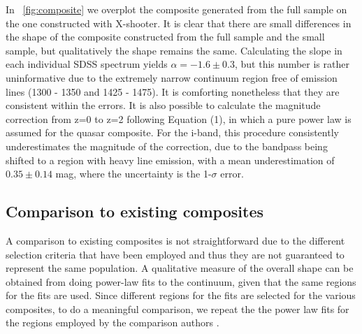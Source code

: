 \documentclass{aa}    %
\newcommand{\figref}[1]{\ref{fig:#1}}
\newcommand{\Fig}[1]{\figurename~\figref{#1}}
\newcommand{\fig}[1]{\Fig{#1}}
\newcommand{\figlabel}[1]{\label{fig:#1}}
\newcommand{\sectlabel}[1]{\label{sect:#1}}
\newcommand{\todo}[3]{{\color{#2}\emph{#1}: #3}}
\newcommand{\jstodo}[1]{\todo{ \\TODO }{green}{#1}}
\begin{document}

In \fig{composite} we overplot the composite generated from the full sample on the one constructed with X-shooter. It is clear that there are small differences in the shape of the composite constructed from the full sample and the small sample, but qualitatively the shape remains the same. Calculating the slope in each individual SDSS spectrum yields $\alpha = -1.6\pm 0.3$, but this number is rather uninformative due to the extremely narrow continuum region free of emission lines (1300 - 1350 and 1425 - 1475). It is comforting nonetheless that they are consistent within the errors. 
It is also possible to calculate the magnitude correction from z=0 to z=2 following \cite{Richards2006a} Equation (1), in which a pure power law is assumed for the quasar composite. For the i-band, this procedure consistently underestimates the magnitude of the correction, due to the bandpass being shifted to a region with heavy line emission, with a mean underestimation of $0.35 \pm 0.14$ mag, where the uncertainty is the 1-$\sigma$ error.





\subsection{Comparison to existing composites} \sectlabel{comparison}

A comparison to existing composites is not straightforward due to the different selection criteria that have been employed and thus they are not guaranteed to represent the same population. A qualitative measure of the overall shape can be obtained from doing power-law fits to the continuum, given that the same regions for the fits are used. Since different regions for the fits are selected for the various composites, to do a meaningful comparison, we repeat the the power law fits for the regions employed by the comparison authors \citep{VandenBerk2001, Telfer2002}. 
\end{document}
